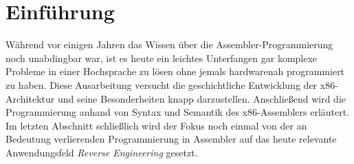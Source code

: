 \section{Einführung}
Während vor einigen Jahren das Wissen über die Assembler-Programmierung noch unabdingbar war, ist es heute ein leichtes Unterfangen gar komplexe Probleme in einer Hochsprache zu lösen ohne jemals hardwarenah programmiert zu haben.
Diese Ausarbeitung versucht die geschichtliche Entwicklung der x86-Architektur und seine Besonderheiten knapp darzustellen. Anschließend wird die Programmierung anhand von Syntax und Semantik des x86-Assemblers erläutert. Im letzten Abschnitt schließlich wird der Fokus noch einmal von der an Bedeutung verlierenden Programmierung in Assembler auf das heute relevante Anwendungsfeld \emph{Reverse Engineering} gesetzt.
